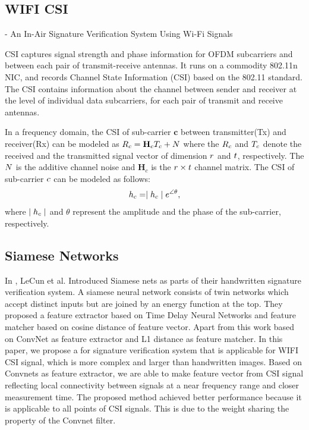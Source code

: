 \documentclass[runningheads]{llncs}
\begin{document}
\subsection{WIFI CSI}
- An In-Air Signature Verification System Using Wi-Fi Signals 

CSI captures signal strength and phase information for OFDM subcarriers and between each pair of transmit-receive antennas.
It runs on a commodity 802.11n NIC, and records Channel State Information (CSI) based on the 802.11 standard.
The CSI contains information about the channel between sender and receiver at the level of individual data subcarriers, for each pair of transmit and receive antennas.

In a frequency domain, the CSI of sub-carrier $\mathbf{c}$ between transmitter(Tx) and receiver(Rx) can be modeled as 
$\mathnormal{R}_{c} = \mathbf{H}_{c}\mathnormal{T}_{c} +\mathnormal{N}$ where the $\mathnormal{R}_{c}$ and $\mathnormal{T}_{c}$  denote the received and the transmitted signal vector of dimension $\mathnormal{r}$ and $\mathnormal{t}$, respectively. The $\mathnormal{N}$ is the additive channel noise and $\mathbf{H}_{c}$ is the $\mathnormal{r}\times\mathnormal{t}$ channel matrix. The CSI of sub-carrier $\mathnormal{c}$ can be modeled as follows:
\begin{equation}
    \mathnormal{h}_{c} = \mid\mathnormal{h}_{c}\mid\mathnormal{e}^{\angle\theta},
\end{equation}
where $\mid\mathnormal{h}_{c}\mid$ and $\theta$ represent the amplitude and the phase of the sub-carrier, respectively.

\subsection{Siamese Networks}

In \cite{bromley1994signature}, LeCun et al. Introduced Siamese nets as parts of their handwritten signature verification system. 
A siamese neural network consists of twin networks which accept distinct inputs but are joined by an energy function at the top.\cite{koch2015siamese}
They proposed a feature extractor based on Time Delay Neural Networks\cite{lang1990time} and feature matcher based on cosine distance of feature vector. Apart from this work based on ConvNet as feature extractor and L1 distance as feature matcher.
In this paper, we propose a for signature verification system that is applicable for WIFI CSI signal, which is more complex and larger than handwritten images. 
Based on Convnets as feature extractor, we are able to make feature vector from CSI signal reflecting local connectivity between signals at a near frequency range and closer measurement time. 
The proposed method achieved better performance because it is applicable to all points of CSI signals. This is due to the weight sharing the property of the Convnet filter.
\end{document}
